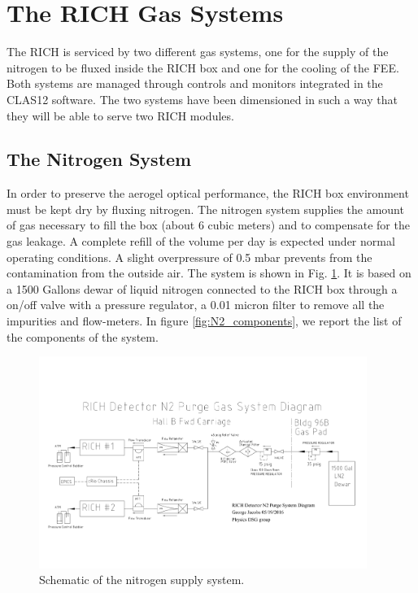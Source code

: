 \documentclass[12pt]{article}
\begin{document}
{\color{blue}
\section{The RICH Gas Systems}
}

The RICH is serviced by two different gas systems, one for the supply of the nitrogen to be fluxed inside the RICH box and one for the cooling of the FEE.
Both systems are managed through controls and monitors integrated in the CLAS12 software.
The two systems have been dimensioned in such a way that they will be able to serve two RICH modules.


\subsection{The Nitrogen System}

In order to preserve the aerogel optical performance, the RICH box environment must be kept dry by fluxing nitrogen.
The nitrogen system supplies the amount of gas necessary to fill the box (about 6 cubic meters) and to compensate for the gas leakage.
A complete refill of the volume per day is expected under normal operating conditions.
A slight overpressure of 0.5 mbar prevents from the contamination from the outside air.
The system is shown in Fig. \ref{fig:N2_drawing}.
It is based on a 1500 Gallons dewar of liquid nitrogen connected to the RICH box through a on/off valve with a pressure regulator, a 0.01 micron filter to remove all the impurities and flow-meters.
In figure \ref{fig:N2_components}, we report the list of the components of the system.

\begin{figure}[h!]
\center
\includegraphics[width=0.95\textwidth]{N2_drawing.jpg}
\caption{ \label{fig:N2_drawing} Schematic of the nitrogen supply system.}
\end{figure}
\end{document}
